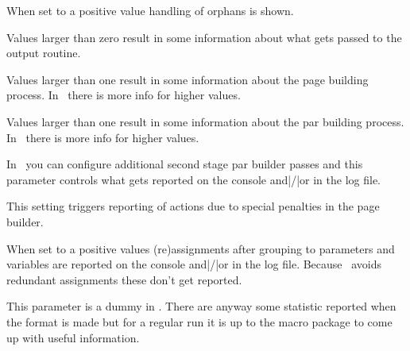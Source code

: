 When set to a positive value handling of orphans is shown.

\stopnewprimitive

\startoldprimitive[title={\prm {tracingoutput}}]

Values larger than zero result in some information about what gets passed to the
output routine.

\stopoldprimitive

\startoldprimitive[title={\prm {tracingpages}}]

Values larger than one result in some information about the page building
process. In \LUAMETATEX\ there is more info for higher values.

\stopoldprimitive

\startoldprimitive[title={\prm {tracingparagraphs}}]

Values larger than one result in some information about the par building process.
In \LUAMETATEX\ there is more info for higher values.

\stopoldprimitive

\startnewprimitive[title={\prm {tracingpasses}}]

In \LUAMETATEX\ you can configure additional second stage par builder passes and
this parameter controls what gets reported on the console and|/|or in the log
file.

\stopnewprimitive

\startnewprimitive[title={\prm {tracingpenalties}}]

This setting triggers reporting of actions due to special penalties in the
page builder.

\stopnewprimitive

\startoldprimitive[title={\prm {tracingrestores}}]

When set to a positive values (re)assignments after grouping to parameters and
variables are reported on the console and|/|or in the log file. Because
\LUAMETATEX\ avoids redundant assignments these don't get reported.

\stopoldprimitive

\startoldprimitive[title={\prm {tracingstats}}]

This parameter is a dummy in \LUAMETATEX. There are anyway some statistic
reported when the format is made but for a regular run it is up to the macro
package to come up with useful information.

\stopoldprimitive

\startnewprimitive[title={\prm {tracingtoddlers}}]

